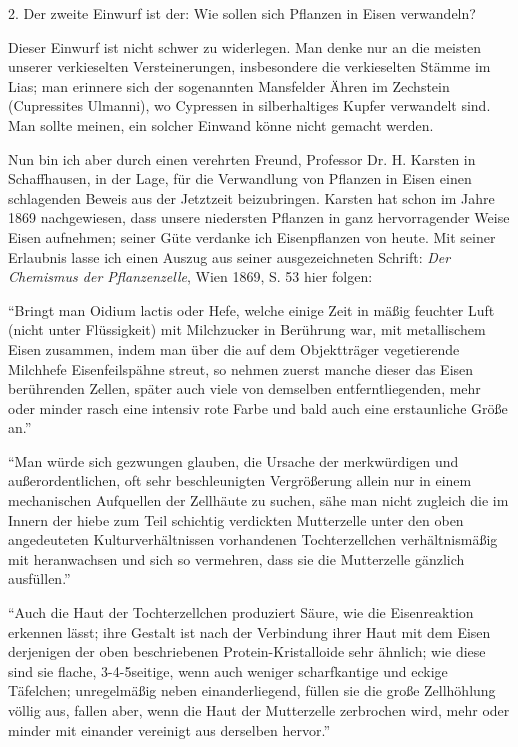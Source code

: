 \documentclass[a4paper, 12pt, oneside]{article}
\begin{document}
2. Der zweite Einwurf ist der: Wie sollen sich Pflanzen in Eisen verwandeln?

Dieser Einwurf ist nicht schwer zu widerlegen. Man denke nur an die meisten unserer verkieselten Versteinerungen, insbesondere die verkieselten Stämme im Lias; man erinnere sich der sogenannten Mansfelder Ähren im Zechstein (Cupressites Ulmanni), wo Cypressen in silberhaltiges Kupfer verwandelt sind. Man sollte meinen, ein solcher Einwand könne nicht gemacht werden.

Nun bin ich aber durch einen verehrten Freund, Professor Dr. H. Karsten in Schaffhausen, in der Lage, für die Verwandlung von Pflanzen in Eisen einen schlagenden Beweis aus der Jetztzeit beizubringen. Karsten hat schon im Jahre 1869 nachgewiesen, dass unsere niedersten Pflanzen in ganz hervorragender Weise Eisen aufnehmen; seiner Güte verdanke ich Eisenpflanzen von heute. Mit seiner Erlaubnis lasse ich einen Auszug aus seiner ausgezeichneten Schrift: \emph{Der Chemismus der Pflanzenzelle}, Wien 1869, S. 53 hier folgen:

"`Bringt man Oidium lactis oder Hefe, welche einige Zeit in mäßig feuchter Luft (nicht unter Flüssigkeit) mit Milchzucker in Berührung war, mit metallischem Eisen zusammen, indem man über die auf dem Objektträger vegetierende Milchhefe Eisenfeilspähne streut, so nehmen zuerst manche dieser das Eisen berührenden Zellen, später auch viele von demselben entferntliegenden, mehr oder minder rasch eine intensiv rote Farbe und bald auch eine erstaunliche Größe an."'

"`Man würde sich gezwungen glauben, die Ursache der merkwürdigen und außerordentlichen, oft sehr beschleunigten Vergrößerung allein nur in einem mechanischen Aufquellen der Zellhäute zu suchen, sähe man nicht zugleich die im Innern der hiebe zum Teil schichtig verdickten Mutterzelle unter den oben angedeuteten Kulturverhältnissen vorhandenen Tochterzellchen verhältnismäßig mit heranwachsen und sich so vermehren, dass sie die Mutterzelle gänzlich ausfüllen."'

"`Auch die Haut der Tochterzellchen produziert Säure, wie die Eisenreaktion erkennen lässt; ihre Gestalt ist nach der Verbindung ihrer Haut mit dem Eisen derjenigen der oben beschriebenen Protein-Kristalloide sehr ähnlich; wie diese sind sie flache, 3-4-5seitige, wenn auch weniger scharfkantige und eckige Täfelchen; unregelmäßig neben einanderliegend, füllen sie die große Zellhöhlung völlig aus, fallen aber, wenn die Haut der Mutterzelle zerbrochen wird, mehr oder minder mit einander vereinigt aus derselben hervor."'
\end{document}
